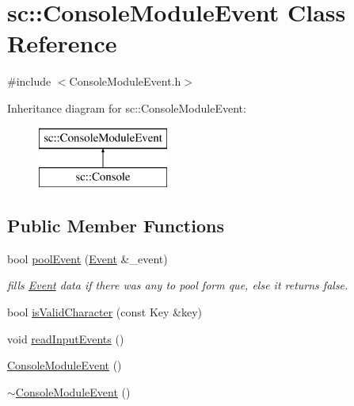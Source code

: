 \hypertarget{classsc_1_1_console_module_event}{}\section{sc\+::Console\+Module\+Event Class Reference}
\label{classsc_1_1_console_module_event}


{\ttfamily \#include $<$Console\+Module\+Event.\+h$>$}

Inheritance diagram for sc\+::Console\+Module\+Event\+:\begin{figure}[H]
\begin{center}
\leavevmode
\includegraphics[height=2.000000cm]{de/dc8/classsc_1_1_console_module_event}
\end{center}
\end{figure}
\subsection*{Public Member Functions}
\begin{DoxyCompactItemize}
\item 
bool \mbox{\hyperlink{classsc_1_1_console_module_event_af7d5a34f185a7de314197be2dc0d946a}{pool\+Event}} (\mbox{\hyperlink{classsc_1_1_event}{Event}} \&\+\_\+event)
\begin{DoxyCompactList}\small\item\em fills \mbox{\hyperlink{classsc_1_1_event}{Event}} data if there was any to pool form que, else it returns false. \end{DoxyCompactList}\item 
bool \mbox{\hyperlink{classsc_1_1_console_module_event_aaa7265f08800bd58a78cd4482ce285c3}{is\+Valid\+Character}} (const Key \&key)
\item 
void \mbox{\hyperlink{classsc_1_1_console_module_event_ac33e2f27e2cf1f78e8237eb415a3008b}{read\+Input\+Events}} ()
\item 
\mbox{\hyperlink{classsc_1_1_console_module_event_a2396c77a93d2cf76588b07ad54579a33}{Console\+Module\+Event}} ()
\item 
\mbox{\hyperlink{classsc_1_1_console_module_event_a6af22ed48f35271e3f3555c369677481}{$\sim$\+Console\+Module\+Event}} ()
\end{DoxyCompactItemize}
